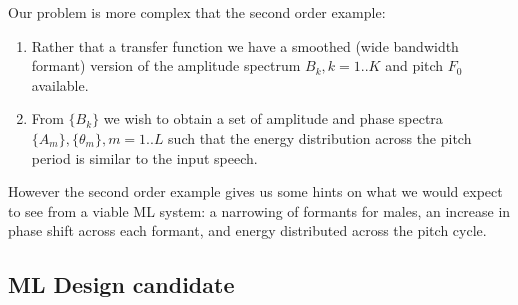 \documentclass{article}
\begin{document}
Our problem is more complex that the second order example:
\begin{enumerate}
\item Rather that a transfer function we have a smoothed (wide bandwidth formant) version of the amplitude spectrum $B_k,k=1..K$ and pitch $F_0$ available.
\item From $\{B_k\}$ we wish to obtain a set of amplitude and phase spectra $\{A_m\}, \{\theta_m\},m=1..L$ such that the energy distribution across the pitch period is similar to the input speech.
\end{enumerate}
However the second order example gives us some hints on what we would expect to see from a viable ML system: a narrowing of formants for males, an increase in phase shift across each formant, and energy distributed across the pitch cycle.

\subsection{ML Design candidate}
\end{document}
